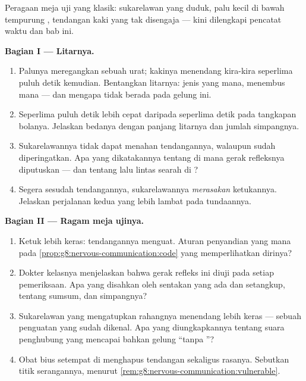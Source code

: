 \begin{problem}\label{pb:g8:nervous-communication:1}
Peragaan meja uji yang klasik: sukarelawan yang duduk, palu
kecil di bawah tempurung , tendangan kaki yang tak
disengaja --- kini dilengkapi pencatat waktu dan bab ini.

\medskip\noindent\textbf{Bagian I --- Litarnya.}
\begin{enumerate}
  \item Palunya meregangkan sebuah urat; kakinya menendang
        kira-kira seperlima puluh detik kemudian. Bentangkan
        litarnya: jenis  yang mana, menembus mana ---
        dan mengapa  tidak berada pada gelung ini.
  \item Seperlima puluh detik lebih cepat daripada seperlima
        detik pada tangkapan bolanya. Jelaskan bedanya
        dengan panjang litarnya dan jumlah simpangnya.
  \item Sukarelawannya tidak dapat menahan tendangannya,
        walaupun sudah diperingatkan. Apa yang dikatakannya
        tentang di mana gerak refleksnya diputuskan --- dan
        tentang lalu lintas searah di ?
  \item Segera sesudah tendangannya, sukarelawannya
        \emph{merasakan} ketukannya. Jelaskan perjalanan
        kedua yang lebih lambat pada tundaannya.
\end{enumerate}

\medskip\noindent\textbf{Bagian II --- Ragam meja ujinya.}
\begin{enumerate}[resume]
  \item Ketuk lebih keras: tendangannya menguat. Aturan
        penyandian yang mana pada
        \cref{prop:g8:nervous-communication:code} yang
        memperlihatkan dirinya?
  \item Dokter kelasnya menjelaskan bahwa gerak refleks ini
        diuji pada setiap pemeriksaan. Apa yang disahkan
        oleh sentakan  yang ada dan setangkup, tentang
        sumsum,  dan simpangnya?
  \item Sukarelawan yang mengatupkan rahangnya menendang
        lebih keras --- sebuah penguatan yang sudah dikenal.
        Apa yang diungkapkannya tentang suara 
        penghubung yang mencapai bahkan gelung ``tanpa ''?
  \item Obat bius setempat di  menghapus tendangan
        sekaligus rasanya. Sebutkan titik serangannya,
        menurut \cref{rem:g8:nervous-communication:vulnerable}.
\end{enumerate}


\end{problem}

